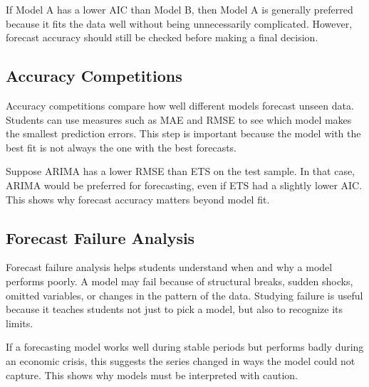 \documentclass[12pt,a4paper]{article}
\begin{document}
\begin{example}
If Model A has a lower AIC than Model B, then Model A is generally preferred because it fits the data well without being unnecessarily complicated. However, forecast accuracy should still be checked before making a final decision.
\end{example}

\subsection{Accuracy Competitions}

Accuracy competitions compare how well different models forecast unseen data. Students can use measures such as MAE and RMSE to see which model makes the smallest prediction errors. This step is important because the model with the best fit is not always the one with the best forecasts.

\begin{example}
Suppose ARIMA has a lower RMSE than ETS on the test sample. In that case, ARIMA would be preferred for forecasting, even if ETS had a slightly lower AIC. This shows why forecast accuracy matters beyond model fit.
\end{example}

\subsection{Forecast Failure Analysis}

Forecast failure analysis helps students understand when and why a model performs poorly. A model may fail because of structural breaks, sudden shocks, omitted variables, or changes in the pattern of the data. Studying failure is useful because it teaches students not just to pick a model, but also to recognize its limits.

\begin{example}
If a forecasting model works well during stable periods but performs badly during an economic crisis, this suggests the series changed in ways the model could not capture. This shows why models must be interpreted with caution.
\end{example}
\end{document}
